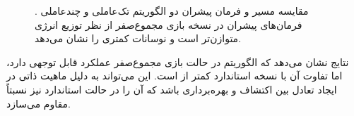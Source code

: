 \begin{figure}[H]
	\centering
	
	
	\caption{
		مقایسه مسیر و فرمان پیشران دو الگوریتم تک‌عاملی و چندعاملی .
		فرمان‌های پیشران در نسخه بازی مجموع‌صفر از نظر توزیع انرژی متوازن‌تر است و نوسانات کمتری را نشان می‌دهد.
	}
\end{figure}

نتایج نشان می‌دهد که الگوریتم  در حالت بازی مجموع‌صفر عملکرد قابل توجهی دارد، اما تفاوت آن با نسخه استاندارد کمتر از  است. این می‌تواند به دلیل ماهیت ذاتی  در ایجاد تعادل بین اکتشاف و بهره‌برداری باشد که آن را در حالت استاندارد نیز نسبتاً مقاوم می‌سازد.


